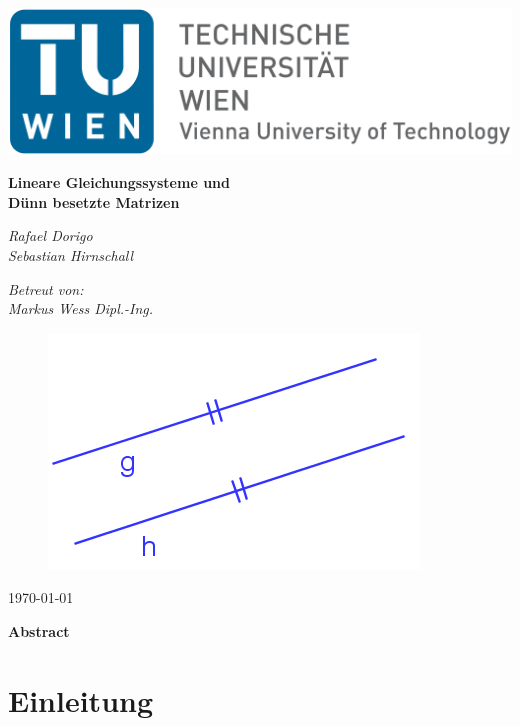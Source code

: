 \documentclass[12pt,a4paper]{scrartcl}
\author{Rafael Dorigo, Sebastian Hirnschall}
\date{\today}
\numberwithin{equation}{section}
\numberwithin{myalgctr}{section}
\numberwithin{mytheoremctr}{subsection}
\numberwithin{mykorollarctr}{subsection}
\numberwithin{mylemmactr}{subsection}
\numberwithin{mybeispielctr}{subsection}
\begin{document}
	\begin{titlepage}
		\begin{flushleft}
				\includegraphics[width=.4\linewidth]{tuwien.png}
		\end{flushleft}	
		\centering
		
		
		\vspace{5cm}
		{\huge\bfseries Lineare Gleichungssysteme und \\Dünn besetzte Matrizen\par}
		\vspace{2cm}
		{\Large\itshape Rafael Dorigo\\Sebastian Hirnschall\par}
		\vspace{1cm}
		{\large\itshape Betreut von:\\Markus Wess Dipl.-Ing.\par}
		\vspace{1cm}
		\begin{figure}[!h]
			\vspace{0cm}
			\centering
			\includegraphics[width=.4\linewidth]{titelbild2.png}
		\end{figure}
		
		\vfill
		
		{\today\par}
	\end{titlepage}
	\restoregeometry
	
	\thispagestyle{firststyle}
	
	\newpage\noindent
	{\LARGE \bfseries Abstract}
	\newline
	\par\noindent
	
	\thispagestyle{firststyle}
	
	\newpage
	\tableofcontents
	\thispagestyle{general}
	\newpage

	\section{Einleitung}
	\newpage
	
\end{document}
